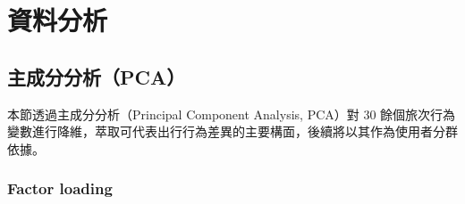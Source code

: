 
\providecommand{\tightlist}{%
  \setlength{\itemsep}{0pt}\setlength{\parskip}{0pt}
}

\chapter{資料分析}\label{ux8cc7ux6599ux5206ux6790}

\section{主成分分析（PCA）}\label{ux4e3bux6210ux5206ux5206ux6790pca}

本節透過主成分分析（Principal Component Analysis, PCA）對 30
餘個旅次行為變數進行降維，萃取可代表出行行為差異的主要構面，後續將以其作為使用者分群依據。

\subsection{Factor loading}\label{factor-loading}

